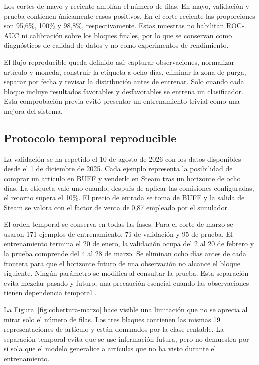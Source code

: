 Los cortes de mayo y reciente amplían el número de filas. En mayo, validación y prueba contienen únicamente casos positivos. En el corte reciente las proporciones son 95,6\%, 100\% y 98,8\%, respectivamente. Estas muestras no habilitan ROC-AUC ni calibración sobre los bloques finales, por lo que se conservan como diagnósticos de calidad de datos y no como experimentos de rendimiento.

El flujo reproducible queda definido así: capturar observaciones, normalizar artículo y moneda, construir la etiqueta a ocho días, eliminar la zona de purga, separar por fecha y revisar la distribución antes de entrenar. Solo cuando cada bloque incluye resultados favorables y desfavorables se entrena un clasificador. Esta comprobación previa evitó presentar un entrenamiento trivial como una mejora del sistema.

\subsection{Protocolo temporal reproducible}

La validación se ha repetido el 10 de agosto de 2026 con los datos disponibles desde el 1 de diciembre de 2025. Cada ejemplo representa la posibilidad de comprar un artículo en BUFF y venderlo en Steam tras un horizonte de ocho días. La etiqueta vale uno cuando, después de aplicar las comisiones configuradas, el retorno supera el 10\%. El precio de entrada se toma de BUFF y la salida de Steam se valora con el factor de venta de 0,87 empleado por el simulador.

El orden temporal se conserva en todas las fases. Para el corte de marzo se usaron 171 ejemplos de entrenamiento, 76 de validación y 95 de prueba. El entrenamiento termina el 20 de enero, la validación ocupa del 2 al 20 de febrero y la prueba comprende del 4 al 28 de marzo. Se eliminan ocho días antes de cada frontera para que el horizonte futuro de una observación no alcance el bloque siguiente. Ningún parámetro se modifica al consultar la prueba. Esta separación evita mezclar pasado y futuro, una precaución esencial cuando las observaciones tienen dependencia temporal \cite{bergmeir2018cv}.

La Figura~\ref{fig:cobertura-marzo} hace visible una limitación que no se aprecia al mirar solo el número de filas. Los tres bloques contienen las mismas 19 representaciones de artículo y están dominados por la clase rentable. La separación temporal evita que se use información futura, pero no demuestra por sí sola que el modelo generalice a artículos que no ha visto durante el entrenamiento.

